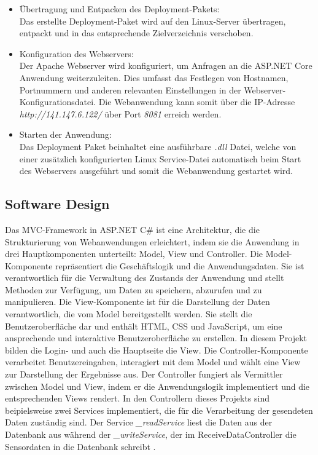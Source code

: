 \documentclass[conference]{IEEEtran}
\begin{document}
\begin{itemize}
	\item Übertragung und Entpacken des Deployment-Pakets: \\
	Das erstellte Deployment-Paket wird auf den Linux-Server übertragen, entpackt und in das entsprechende Zielverzeichnis verschoben.
	\item Konfiguration des Webservers: \\
	Der Apache Webserver wird konfiguriert, um Anfragen an die ASP.NET Core Anwendung weiterzuleiten. Dies umfasst das Festlegen von Hostnamen, Portnummern und anderen relevanten Einstellungen in der Webserver-Konfigurationsdatei. Die Webanwendung kann somit über die IP-Adresse \textit{http://141.147.6.122/} über Port \textit{8081} erreich werden.
	\item Starten der Anwendung: \\
	Das Deployment Paket beinhaltet eine ausführbare \textit{.dll} Datei, welche von einer zusätzlich konfigurierten Linux Service-Datei automatisch beim Start des Webservers ausgeführt und somit die Webanwendung gestartet wird.
\end{itemize}
\subsection{Software Design}
Das MVC-Framework in ASP.NET C\# ist eine Architektur, die die Strukturierung von Webanwendungen erleichtert, indem sie die Anwendung in drei Hauptkomponenten unterteilt: Model, View und Controller. Die Model-Komponente repräsentiert die Geschäftslogik und die Anwendungsdaten. Sie ist verantwortlich für die Verwaltung des Zustands der Anwendung und stellt Methoden zur Verfügung, um Daten zu speichern, abzurufen und zu manipulieren. Die View-Komponente ist für die Darstellung der Daten verantwortlich, die vom Model bereitgestellt werden. Sie stellt die Benutzeroberfläche dar und enthält HTML, CSS und JavaScript, um eine ansprechende und interaktive Benutzeroberfläche zu erstellen. In diesem Projekt bilden die Login- und auch die Hauptseite die View. Die Controller-Komponente verarbeitet Benutzereingaben, interagiert mit dem Model und wählt eine View zur Darstellung der Ergebnisse aus. Der Controller fungiert als Vermittler zwischen Model und View, indem er die Anwendungslogik implementiert und die entsprechenden Views rendert. In den Controllern dieses Projekts sind beipielsweise zwei Services implementiert, die für die Verarbeitung der gesendeten Daten zuständig sind. Der Service \textit{\_readService} liest die Daten aus der Datenbank aus während der \textit{\_writeService}, der im ReceiveDataController die Sensordaten in die Datenbank schreibt \cite{mvc}.
\end{document}
